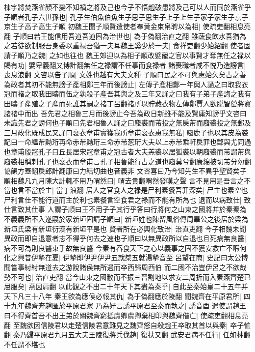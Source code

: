 棟宇將焚燕雀顔不變不知禍之將及己也今子不悟趙破患將及己可以人而同於燕雀乎子順者孔子六世孫也|{
	孔子生伯魚伯魚生子思子思生子上子上生子家子家生子京子京生子高子高生子順}
初魏王聞子順賢遣使者奉黄金束帛聘以為相|{
	使疏吏翻相息亮翻}
子順曰若王能信用吾道吾道固為治世也|{
	為于偽翻治直之翻}
雖蔬食飲水吾猶為之若徒欲制服吾身委以重禄吾猶一夫耳魏王奚少於一夫|{
	食祥吏翻少始紹翻}
使者固請子順乃之魏|{
	之如也往也}
魏王郊迎以為相子順改嬖寵之官以事賢才奪無任之禄以賜有功|{
	嬖卑義翻又博計翻無任之禄謂不任事而食禄者}
諸喪職者咸不悦乃造謗言|{
	喪息浪翻}
文咨以告子順|{
	文姓也越有大夫文種}
子順曰民之不可與慮始久矣古之善為政者其初不能無謗子產相鄭三年而後謗止|{
	左傳子產相鄭一年輿人誦之曰取我衣冠而褚之取我田疇而伍之孰殺子產吾其與之及三年又誦之曰我有子弟子產誨之我有田疇子產殖之子產而死誰其嗣之禇丁呂翻禇所以貯藏衣物左傳鄭賈人欲脱智罃將寘諸禇中而出}
吾先君之相魯三月而後謗止今吾為政日新雖不能及賢庸知謗乎文咨曰未識先君之謗何也子順曰先君相魯人誦之曰麛裘而芾投之無戾芾而麛裘投之無郵及三月政化既成民又誦曰衮衣章甫實獲我所章甫衮衣惠我無私|{
	麛鹿子也以其皮為裘記曰一命緼芾黝珩再命赤芾黝珩三命赤芾葱珩大夫以上赤芾乘軒戾罪也郵與尤同過也章甫殷冠孔子曰丘長居宋冠章甫之冠古者大夫羔裘以居狐裘以朝麛裘而芾謂芾與麛裘相稱刺孔子也衮衣而章甫言孔子相魯能行古之道也麛莫兮翻康綿披切芾分勿翻協韻方蓋翻戾郎計翻康曰力結切曲也音義非}
文咨喜曰乃今知先生不異乎聖賢矣子順相魏凡九月陳大計輒不用乃喟然曰|{
	喟去貴翻喟然發嘆之聲}
言不見用是吾言之不當也言不當於主|{
	當丁浪翻}
居人之官食人之禄是尸利素餐吾罪深矣|{
	尸主也素空也尸利言仕不能行道而主於利也素餐言空食君之禄而不能有所為也}
退而以病致仕|{
	致仕言致其仕事}
人謂子順曰王不用子子其行乎答曰行將何之山東之國將并於秦秦為不義義所不入遂寢於家新垣固請子順曰|{
	新垣姓也陳留風俗傳周畢公之後居於梁為新垣氏梁有新垣衍漢有新垣平是也}
賢者所在必興化致治|{
	治直吏翻}
今子相魏未聞異政而即自退意者志不得乎何去之速也子順曰以無異政所以自退也且死病無良醫|{
	病不可為則良醫束手故無良醫}
今秦有吞食天下之心以義事之固不獲安救亡不暇何化之興昔伊摯在夏|{
	伊摯即伊尹伊尹五就桀五就湯摯音至}
呂望在商|{
	史記曰太公博聞嘗事紂紂無道去之游說諸侯無所遇而卒西歸周西伯}
而二國不治豈伊呂之不欲哉勢不可也|{
	治直吏翻}
當今山東之國敝而不振三晉割地以求安二周折而入秦燕齊楚已屈服矣|{
	燕因肩翻}
以此觀之不出二十年天下其盡為秦乎|{
	自此至秦始皇二十五年并天下凡三十八年}
秦王欲為應侯必報其仇|{
	為于偽翻應於陵翻}
聞魏齊在平原君所|{
	四十九年魏齊奔趙匿於平原君家}
乃為好言誘平原君至秦而執之|{
	誘音酉}
遣使謂趙王曰不得齊首吾不出王弟於關魏齊窮抵虞卿虞卿棄相印與魏齊偕亡|{
	使疏吏翻相息亮翻}
至魏欲因信陵君以走楚信陵君意難見之魏齊怒自殺趙王卒取其首以與秦|{
	卒子恤翻}
秦乃歸平原君九月五大夫王陵復將兵伐趙|{
	復扶又翻}
武安君病不任行|{
	任如林翻不任謂不堪也}


